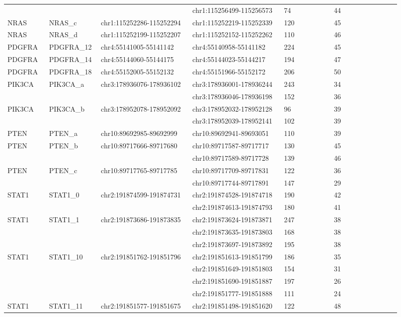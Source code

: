 \begin{landscape}
\begin{longtable}{p{0.1\linewidth}|p{0.1\linewidth}p{0.22\linewidth}p{0.22\linewidth}p{0.12\linewidth}p{0.16\linewidth}}
 & & & chr1:115256499-115256573 & 74 & 44
\\
NRAS & NRAS\_c & chr1:115252286-115252294 & chr1:115252219-115252339 & 120 & 45
\\
NRAS & NRAS\_d & chr1:115252199-115252207 & chr1:115252152-115252262 & 110 & 46
\\
\hline
PDGFRA & PDGFRA\_12 & chr4:55141005-55141142 & chr4:55140958-55141182 & 224 & 45
\\
PDGFRA & PDGFRA\_14 & chr4:55144060-55144175 & chr4:55144023-55144217 & 194 & 47
\\
PDGFRA & PDGFRA\_18 & chr4:55152005-55152132 & chr4:55151966-55152172 & 206 & 50
\\
\hline
PIK3CA & PIK3CA\_a & chr3:178936076-178936102 & chr3:178936001-178936244 & 243 & 34
\\
 & & & chr3:178936046-178936198 & 152 & 36
\\
PIK3CA & PIK3CA\_b & chr3:178952078-178952092 & chr3:178952032-178952128 & 96 & 39
\\
 & & & chr3:178952039-178952141 & 102 & 39
\\
\hline
PTEN & PTEN\_a & chr10:89692985-89692999 & chr10:89692941-89693051 & 110 & 39
\\
PTEN & PTEN\_b & chr10:89717666-89717680 & chr10:89717587-89717717 & 130 & 45
\\
 & & & chr10:89717589-89717728 & 139 & 46
\\
PTEN & PTEN\_c & chr10:89717765-89717785 & chr10:89717709-89717831 & 122 & 36
\\
 & & & chr10:89717744-89717891 & 147 & 29
\\
\hline
STAT1 & STAT1\_0 & chr2:191874599-191874731 & chr2:191874528-191874718 & 190 & 42
\\
 & & & chr2:191874613-191874793 & 180 & 41
\\
STAT1 & STAT1\_1 & chr2:191873686-191873835 & chr2:191873624-191873871 & 247 & 38
\\
 & & & chr2:191873635-191873803 & 168 & 38
\\
 & & & chr2:191873697-191873892 & 195 & 38
\\
STAT1 & STAT1\_10 & chr2:191851762-191851796 & chr2:191851613-191851799 & 186 & 35
\\
 & & & chr2:191851649-191851803 & 154 & 31
\\
 & & & chr2:191851690-191851887 & 197 & 26
\\
 & & & chr2:191851777-191851888 & 111 & 24
\\
STAT1 & STAT1\_11 & chr2:191851577-191851675 & chr2:191851498-191851620 & 122 & 48

\end{longtable}
\end{landscape}
